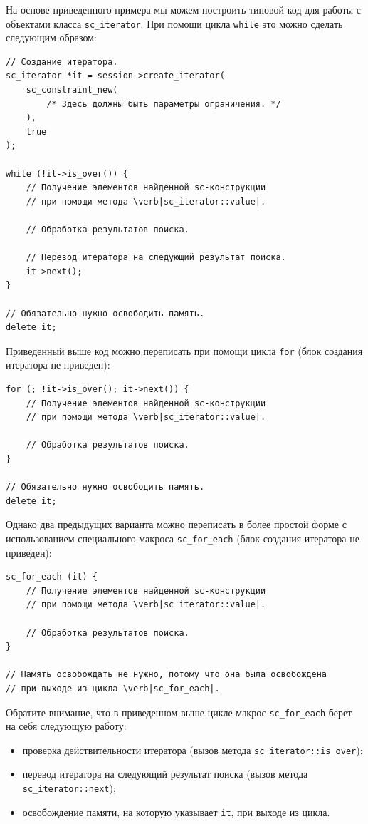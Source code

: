 На основе приведенного примера мы можем построить типовой код для
работы с объектами класса \lstinline|sc_iterator|. При помощи цикла
\lstinline|while| это можно сделать следующим образом:
\begin{lstlisting}[texcl]
// Создание итератора.
sc_iterator *it = session->create_iterator(
    sc_constraint_new(
        /* Здесь должны быть параметры ограничения. */
    ),
    true
);

while (!it->is_over()) {
    // Получение элементов найденной sc-конструкции
    // при помощи метода \verb|sc_iterator::value|.

    // Обработка результатов поиска.

    // Перевод итератора на следующий результат поиска.
    it->next();
}

// Обязательно нужно освободить память.
delete it;
\end{lstlisting}

Приведенный выше код можно переписать при помощи цикла \lstinline|for|
(блок создания итератора не приведен):
\begin{lstlisting}[texcl]
for (; !it->is_over(); it->next()) {
    // Получение элементов найденной sc-конструкции
    // при помощи метода \verb|sc_iterator::value|.

    // Обработка результатов поиска.
}

// Обязательно нужно освободить память.
delete it;
\end{lstlisting}

Однако два предыдущих варианта можно переписать в более простой форме
с использованием специального макроса \lstinline|sc_for_each| (блок
создания итератора не приведен):
\begin{lstlisting}[texcl]
sc_for_each (it) {
    // Получение элементов найденной sc-конструкции
    // при помощи метода \verb|sc_iterator::value|.

    // Обработка результатов поиска.
}

// Память освобождать не нужно, потому что она была освобождена
// при выходе из цикла \verb|sc_for_each|.
\end{lstlisting}

Обратите внимание, что в приведенном выше цикле макрос
\lstinline|sc_for_each| берет на себя следующую работу:
\begin{itemize}
\item проверка действительности итератора (вызов метода
  \lstinline|sc_iterator::is_over|);
\item перевод итератора на следующий результат поиска (вызов метода
  \lstinline|sc_iterator::next|);
\item освобождение памяти, на которую указывает \lstinline|it|, при
  выходе из цикла.
\end{itemize}


